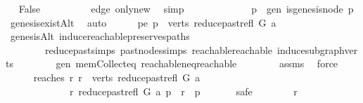 \begin{isabellebody}
\ \isamarkupfalse%
\ False\isanewline
\ \ \ \ \ \ \ \ \isamarkupfalse%
\ edge\ only{\isacharunderscore}{\kern0pt}new\ \isamarkupfalse%
\ simp\isanewline
\ \ \ \ \isamarkupfalse%
\isanewline
\ \ \isamarkupfalse%
\isanewline
\ \ \ \ \isamarkupfalse%
\ p\ \ gen{\isacharcolon}{\kern0pt}\ {\isachardoublequoteopen}is{\isacharunderscore}{\kern0pt}genesis{\isacharunderscore}{\kern0pt}node\ p{\isachardoublequoteclose}\ \isamarkupfalse%
\ genesis{\isacharunderscore}{\kern0pt}existAlt\ \isamarkupfalse%
\ auto\isanewline
\ \ \ \ \isamarkupfalse%
\ pe{\isacharcolon}{\kern0pt}\ {\isachardoublequoteopen}p\ {\isasymin}\ verts\ {\isacharparenleft}{\kern0pt}reduce{\isacharunderscore}{\kern0pt}past{\isacharunderscore}{\kern0pt}refl\ G\ a{\isacharparenright}{\kern0pt}{\isachardoublequoteclose}\isanewline
\ \ \ \ \ \ \isamarkupfalse%
\ genesisAlt\ induce{\isacharunderscore}{\kern0pt}reachable{\isacharunderscore}{\kern0pt}preserves{\isacharunderscore}{\kern0pt}paths\isanewline
\ \ \ \ \ \ \ \ reduce{\isacharunderscore}{\kern0pt}past{\isachardot}{\kern0pt}simps\ past{\isacharunderscore}{\kern0pt}nodes{\isachardot}{\kern0pt}simps\ reachable{}{\isacharunderscore}{\kern0pt}reachable\ induce{\isacharunderscore}{\kern0pt}subgraph{\isacharunderscore}{\kern0pt}verts\isanewline
\ \ \ \ \ \ \ \ gen\ mem{\isacharunderscore}{\kern0pt}Collect{\isacharunderscore}{\kern0pt}eq\ reachable{\isacharunderscore}{\kern0pt}neq{\isacharunderscore}{\kern0pt}reachable{}\isanewline
\ \ \ \ \ \ \ \ assms\ \isamarkupfalse%
\ force\ \ \ \ \isanewline
\ \ \ \ \isamarkupfalse%
\ reaches{\isacharcolon}{\kern0pt}\ {\isachardoublequoteopen}{\isacharparenleft}{\kern0pt}{\isasymforall}r{\isachardot}{\kern0pt}\ r\ {\isasymin}\ verts\ {\isacharparenleft}{\kern0pt}reduce{\isacharunderscore}{\kern0pt}past{\isacharunderscore}{\kern0pt}refl\ G\ a{\isacharparenright}{\kern0pt}\ {\isasymlongrightarrow}\isanewline
\ \ \ \ \ \ \ \ \ \ \ \ \ {\isacharparenleft}{\kern0pt}r\ {\isasymrightarrow}\isactrlsup {\isacharplus}{\kern0pt}\isactrlbsub reduce{\isacharunderscore}{\kern0pt}past{\isacharunderscore}{\kern0pt}refl\ G\ a\isactrlesub \ p\ {\isasymor}\ r\ {\isacharequal}{\kern0pt}\ p{\isacharparenright}{\kern0pt}{\isacharparenright}{\kern0pt}{\isachardoublequoteclose}\ \isanewline
\ \ \ \ \isamarkupfalse%
\ safe\isanewline
\ \ \ \ \ \ \isamarkupfalse%
\ r\isanewline

\end{isabellebody}
